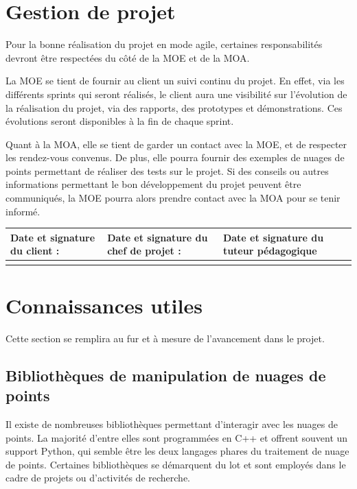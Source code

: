 \documentclass[12pt,titlepage,french]{article}
\begin{document}
\section{Gestion de projet}

Pour la bonne réalisation du projet en mode agile, certaines responsabilités devront être respectées du côté de la MOE et de la MOA.

La MOE se tient de fournir au client un suivi continu du projet. En effet, via les différents sprints qui seront réalisés, le client aura une visibilité sur l'évolution de la réalisation du projet, via des rapports, des prototypes et démonstrations. Ces évolutions seront disponibles à la fin de chaque sprint.

Quant à la MOA, elle se tient de garder un contact avec la MOE, et de respecter les rendez-vous convenus. De plus, elle pourra fournir des exemples de nuages de points permettant de réaliser des tests sur le projet. Si des conseils ou autres informations permettant le bon développement du projet peuvent être communiqués, la MOE pourra alors prendre contact avec la MOA pour se tenir informé.\\
\noindent\begin{tabularx}{\textwidth}{|X|X|X|}
    \hline
    \textbf{Date et signature du client :} & \textbf{Date et signature du chef de projet :} & \textbf{Date et signature du tuteur pédagogique}\\
    \hline
   \rule{0pt}{3cm} &
    &\\
    \hline

\end{tabularx}

\section{Connaissances utiles}

Cette section se remplira au fur et à mesure de l'avancement dans le projet.

\subsection*{Bibliothèques de manipulation de nuages de points}
Il existe de nombreuses bibliothèques permettant d'interagir avec les nuages de points. La majorité d'entre elles sont programmées en C++ et offrent souvent un support Python, qui semble être les deux langages phares du traitement de nuage de points.
Certaines bibliothèques se démarquent du lot et sont employés dans le cadre de projets ou d'activités de recherche.
\end{document}
